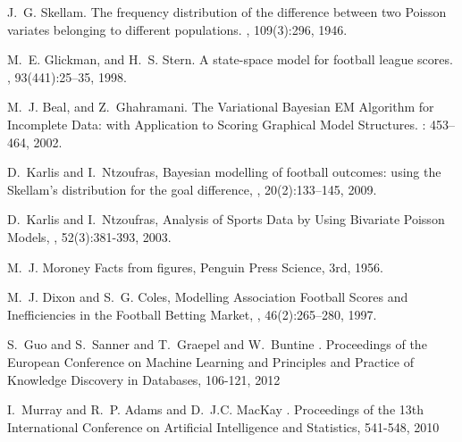 \begin{thebibliography}{}

J.~G. Skellam.
\newblock The frequency distribution of the difference between two
{P}oisson variates belonging to different populations.
, 109(3):296,
  1946.

M.~E. Glickman, and H.~S. Stern.
\newblock A state-space model for football league scores.
, 93(441):25--35,
  1998.

M.~J. Beal, and Z.~Ghahramani.
\newblock The Variational {B}ayesian {EM} Algorithm for Incomplete Data: with
	Application to Scoring Graphical Model Structures.
: 453--464,
2002.

D.~Karlis and I.~Ntzoufras,
\newblock Bayesian modelling of football outcomes: using the {S}kellam's distribution
	for the goal difference,
, 20(2):133--145, 2009.

D.~Karlis and I.~Ntzoufras,
\newblock Analysis of Sports Data by Using Bivariate {P}oisson Models,
, 52(3):381-393, 2003.

M.~J. Moroney
\newblock Facts from figures,
\newblock Penguin Press Science, 3rd, 1956.

M.~J. Dixon and S.~G. Coles,
\newblock Modelling Association Football Scores and Inefficiencies in the Football Betting Market,
, 46(2):265--280, 1997.

S.~Guo and S.~Sanner and T.~Graepel and W.~Buntine
.
\newblock Proceedings of the European Conference on Machine Learning and Principles
	and Practice of Knowledge Discovery in Databases, 106-121, 2012


I.~Murray and R.~P. Adams and D.~J.C. MacKay
.
\newblock Proceedings of the 13th International Conference on Artificial Intelligence
	and Statistics, 541-548, 2010
	
\end{thebibliography}